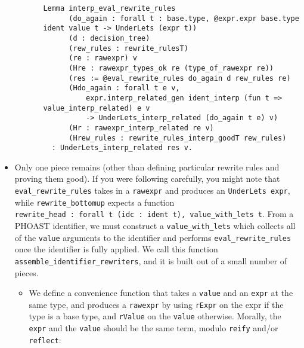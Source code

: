 \documentclass[
]{article}
\begin{document}
\begin{itemize}
\begin{itemize}
\begin{itemize}
\begin{verbatim}
Lemma interp_eval_rewrite_rules
      (do_again : forall t : base.type, @expr.expr base.type ident value t -> UnderLets (expr t))
      (d : decision_tree)
      (rew_rules : rewrite_rulesT)
      (re : rawexpr) v
      (Hre : rawexpr_types_ok re (type_of_rawexpr re))
      (res := @eval_rewrite_rules do_again d rew_rules re)
      (Hdo_again : forall t e v,
          expr.interp_related_gen ident_interp (fun t => value_interp_related) e v
          -> UnderLets_interp_related (do_again t e) v)
      (Hr : rawexpr_interp_related re v)
      (Hrew_rules : rewrite_rules_interp_goodT rew_rules)
  : UnderLets_interp_related res v.
\end{verbatim}
    \end{itemize}
  \end{itemize}
\item
  Only one piece remains (other than defining particular rewrite rules
  and proving them good). If you were following carefully, you might
  note that \texttt{eval\_rewrite\_rules} takes in a \texttt{rawexpr}
  and produces an \texttt{UnderLets\ expr}, while
  \texttt{rewrite\_bottomup} expects a function
  \texttt{rewrite\_head\ :\ forall\ t\ (idc\ :\ ident\ t),\ value\_with\_lets\ t}.
  From a PHOAST identifier, we must construct a
  \texttt{value\_with\_lets} which collects all of the \texttt{value}
  arguments to the identifier and performs \texttt{eval\_rewrite\_rules}
  once the identifier is fully applied. We call this function
  \texttt{assemble\_identifier\_rewriters}, and it is built out of a
  small number of pieces.

  \begin{itemize}
  \item
    We define a convenience function that takes a \texttt{value} and an
    \texttt{expr} at the same type, and produces a \texttt{rawexpr} by
    using \texttt{rExpr} on the expr if the type is a base type, and
    \texttt{rValue} on the \texttt{value} otherwise. Morally, the
    \texttt{expr} and the \texttt{value} should be the same term, modulo
    \texttt{reify} and/or \texttt{reflect}:


\end{itemize}
\end{itemize}
\end{document}

